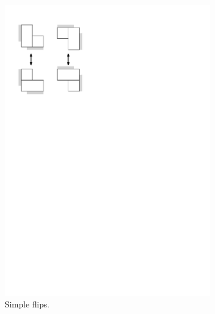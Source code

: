 \documentclass{amsart}
\theoremstyle{definition}
\begin{document}
\begin{figure}
  \begin{center}
  \begin{subfigure}{0.3\textwidth}
    \begin{center}
    \includegraphics[page=2, scale=.5]{flipGraph.pdf}
    \caption{Simple flips.}
    \end{center}
    \end{subfigure}
  \begin{subfigure}{0.3\textwidth}
    \begin{center}

\end{center}
\end{subfigure}
\end{center}
\end{figure}
\end{document}
